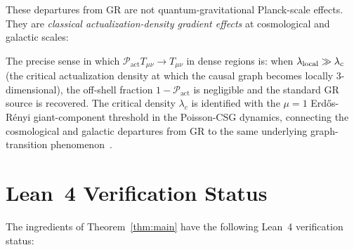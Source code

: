 \documentclass[11pt,a4paper]{article}
\newcommand{\Pact}{\mathcal{P}_{\mathrm{act}}}
\begin{document}
These departures from GR are not quantum-gravitational Planck-scale
effects. They are \emph{classical actualization-density gradient
effects} at cosmological and galactic scales:

The precise sense in which $\Pact T_{\mu\nu} \to T_{\mu\nu}$ in
dense regions is: when $\lambda_{\rm local} \gg \lambda_c$ (the
critical actualization density at which the causal graph becomes
locally 3-dimensional), the off-shell fraction $1 - \Pact$ is
negligible and the standard GR source is recovered. The critical
density $\lambda_c$ is identified with the $\mu = 1$
Erd\H{o}s-R\'{e}nyi giant-component threshold in the Poisson-CSG
dynamics, connecting the cosmological and galactic departures from GR
to the same underlying graph-transition
phenomenon~\citep{Sandeman2026RAQI}.

\section{Lean~4 Verification Status}
\label{sec:lean}

The ingredients of Theorem~\ref{thm:main} have the following Lean~4
verification status:
\end{document}
